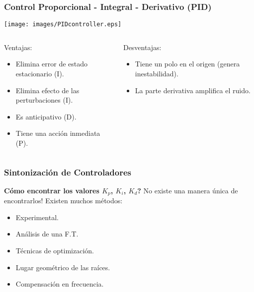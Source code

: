\documentclass[aspectratio=169,handout]{beamer}
\theoremstyle{definition}
\theoremstyle{plain}
\theoremstyle{remark}
\begin{document}
\begin{frame}[<+->]\frametitle{Control Proporcional - Integral - Derivativo (PID)}
\begin{center}
  \texttt{[image: images/PIDcontroller.eps]}
\end{center}
\begin{columns}
\begin{column}{0.5\textwidth}
Ventajas:
\begin{itemize}
  \item Elimina error de estado estacionario (I).
  \item Elimina efecto de las perturbaciones (I).
  \item Es anticipativo (D).
  \item Tiene una acción inmediata (P).
\end{itemize}
\end{column}
\begin{column}{0.5\textwidth}
Desventajas:
\begin{itemize}
  \item Tiene un polo en el origen (genera inestabilidad).
  \item La parte derivativa amplifica el ruido.
\end{itemize}
\end{column}
\end{columns}
\end{frame}

\begin{frame}[<+->]\frametitle{Sintonización de Controladores}
\textbf{Cómo encontrar los valores $K_p$, $K_i$, $K_d$?} No existe una manera única de encontrarlos! Existen muchos métodos:
\begin{itemize}
  \item Experimental.
  \item Análisis de una F.T.
  \item Técnicas de optimización.
  \item Lugar geométrico de las raíces.
  \item Compensación en frecuencia.
\end{itemize}
\end{frame}
\end{document}
